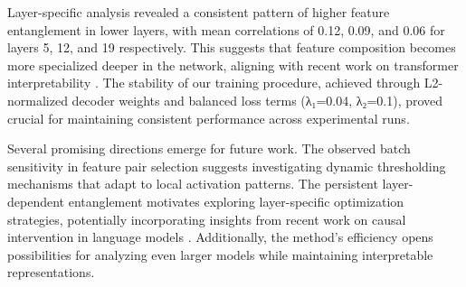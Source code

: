 \documentclass{article} %
\begin{document}
Layer-specific analysis revealed a consistent pattern of higher feature entanglement in lower layers, with mean correlations of 0.12, 0.09, and 0.06 for layers 5, 12, and 19 respectively. This suggests that feature composition becomes more specialized deeper in the network, aligning with recent work on transformer interpretability \cite{Geva2022TransformerFL}. The stability of our training procedure, achieved through L2-normalized decoder weights and balanced loss terms (λ₁=0.04, λ₂=0.1), proved crucial for maintaining consistent performance across experimental runs.

Several promising directions emerge for future work. The observed batch sensitivity in feature pair selection suggests investigating dynamic thresholding mechanisms that adapt to local activation patterns. The persistent layer-dependent entanglement motivates exploring layer-specific optimization strategies, potentially incorporating insights from recent work on causal intervention in language models \cite{Lee2024CausalIO}. Additionally, the method's efficiency opens possibilities for analyzing even larger models while maintaining interpretable representations.



\end{document}
